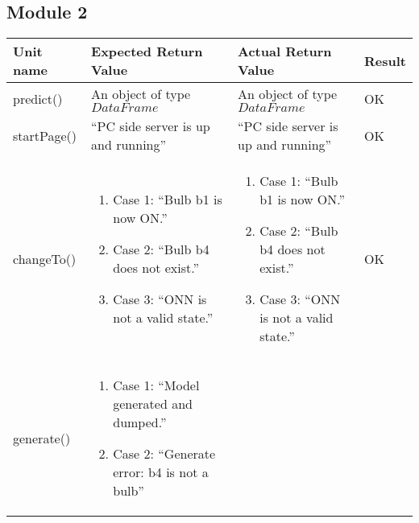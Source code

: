 \subsection{Module 2}
\begin{tabular}{|p{2.25cm}|p{5cm}|p{5cm}|p{1.25cm}|}
\hline
\textbf{Unit name} & \textbf{Expected Return Value} & \textbf{Actual Return Value} & \textbf{Result} \\
\hline
predict() & An object of type $DataFrame$ & An object of type $DataFrame$ & OK \\
\hline
startPage() & ``PC side server is up and running'' & ``PC side server is up and running'' & OK \\
\hline
\vspace*{\baselineskip}changeTo() & \begin{enumerate}
\item[] \hspace*{-1cm}Case 1: ``Bulb b1 is now ON.''
\item[] \hspace*{-1cm}Case 2: ``Bulb b4 does not exist.''
\item[] \hspace*{-1cm}Case 3: ``ONN is not a valid state.''
\end{enumerate} & \begin{enumerate}
\item[] \hspace*{-1cm}Case 1: ``Bulb b1 is now ON.''
\item[] \hspace*{-1cm}Case 2: ``Bulb b4 does not exist.''
\item[] \hspace*{-1cm}Case 3: ``ONN is not a valid state.''
\end{enumerate} & \vspace*{\baselineskip}OK \\
\hline
\vspace*{\baselineskip}generate() & \begin{enumerate}
\item[] \hspace*{-1cm}Case 1: ``Model generated and dumped.''
\item[] \hspace*{-1cm}Case 2: ``Generate error: b4 is not a bulb''
\end{enumerate} & \begin{enumerate}

\end{enumerate}
\end{tabular}
